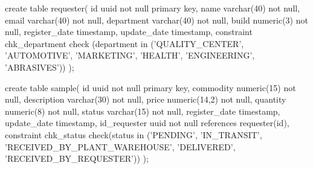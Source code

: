 create table requester(
	id uuid not null primary key,
	name varchar(40) not null,
	email varchar(40) not null,
	department varchar(40) not null,
	build numeric(3) not null,
	register_date timestamp,
	update_date timestamp,
	constraint chk_department check (department in ('QUALITY_CENTER', 'AUTOMOTIVE', 'MARKETING', 'HEALTH', 'ENGINEERING', 'ABRASIVES'))
);

create table sample(
	id uuid not null primary key,
	commodity numeric(15) not null,
	description varchar(30) not null,
	price numeric(14,2) not null,
	quantity numeric(8) not null,
	status varchar(15) not null,
    register_date timestamp,
    update_date timestamp,
	id_requester uuid not null references requester(id),
	constraint chk_status check(status in ('PENDING', 'IN_TRANSIT', 'RECEIVED_BY_PLANT_WAREHOUSE', 'DELIVERED', 'RECEIVED_BY_REQUESTER'))
);